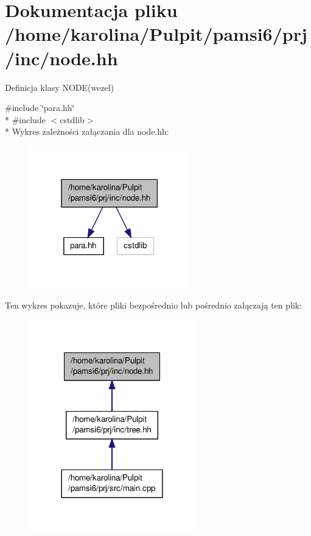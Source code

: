 \hypertarget{node_8hh}{\section{Dokumentacja pliku /home/karolina/\-Pulpit/pamsi6/prj/inc/node.hh}
\label{node_8hh}
}


Definicja klasy N\-O\-D\-E(wezel)  


{\ttfamily \#include \char`\"{}para.\-hh\char`\"{}}\\*
{\ttfamily \#include $<$cstdlib$>$}\\*
Wykres zależności załączania dla node.\-hh\-:\nopagebreak
\begin{figure}[H]
\begin{center}
\leavevmode
\includegraphics[width=198pt]{node_8hh__incl}
\end{center}
\end{figure}
Ten wykres pokazuje, które pliki bezpośrednio lub pośrednio załączają ten plik\-:\nopagebreak
\begin{figure}[H]
\begin{center}
\leavevmode
\includegraphics[width=204pt]{node_8hh__dep__incl}
\end{center}
\end{figure}
